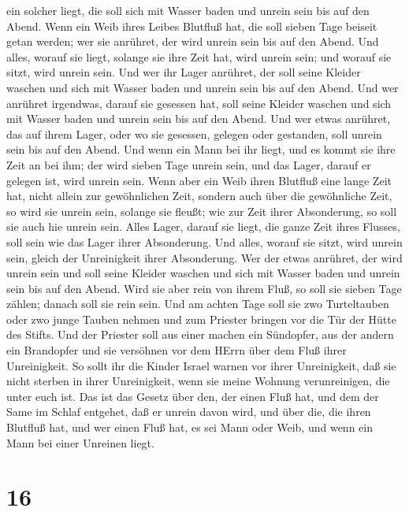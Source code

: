 ein solcher liegt, die soll sich mit Wasser baden und unrein sein bis
auf den Abend.  Wenn ein Weib ihres Leibes Blutfluß hat,
die soll sieben Tage beiseit getan werden; wer sie anrühret, der wird
unrein sein bis auf den Abend.  Und alles, worauf sie
liegt, solange sie ihre Zeit hat, wird unrein sein; und worauf sie
sitzt, wird unrein sein.  Und wer ihr Lager anrühret, der
soll seine Kleider waschen und sich mit Wasser baden und unrein sein bis
auf den Abend.  Und wer anrühret irgendwas, darauf sie
gesessen hat, soll seine Kleider waschen und sich mit Wasser baden und
unrein sein bis auf den Abend.  Und wer etwas anrühret, das
auf ihrem Lager, oder wo sie gesessen, gelegen oder gestanden, soll
unrein sein bis auf den Abend.  Und wenn ein Mann bei ihr
liegt, und es kommt sie ihre Zeit an bei ihm; der wird sieben Tage
unrein sein, und das Lager, darauf er gelegen ist, wird unrein sein.
 Wenn aber ein Weib ihren Blutfluß eine lange Zeit hat,
nicht allein zur gewöhnlichen Zeit, sondern auch über die gewöhnliche
Zeit, so wird sie unrein sein, solange sie fleußt; wie zur Zeit ihrer
Absonderung, so soll sie auch hie unrein sein.  Alles
Lager, darauf sie liegt, die ganze Zeit ihres Flusses, soll sein wie das
Lager ihrer Absonderung. Und alles, worauf sie sitzt, wird unrein sein,
gleich der Unreinigkeit ihrer Absonderung.  Wer der etwas
anrühret, der wird unrein sein und soll seine Kleider waschen und sich
mit Wasser baden und unrein sein bis auf den Abend.  Wird
sie aber rein von ihrem Fluß, so soll sie sieben Tage zählen; danach
soll sie rein sein.  Und am achten Tage soll sie zwo
Turteltauben oder zwo junge Tauben nehmen und zum Priester bringen vor
die Tür der Hütte des Stifts.  Und der Priester soll aus
einer machen ein Sündopfer, aus der andern ein Brandopfer und sie
versöhnen vor dem HErrn über dem Fluß ihrer Unreinigkeit. 
So sollt ihr die Kinder Israel warnen vor ihrer Unreinigkeit, daß sie
nicht sterben in ihrer Unreinigkeit, wenn sie meine Wohnung
verunreinigen, die unter euch ist.  Das ist das Gesetz über
den, der einen Fluß hat, und dem der Same im Schlaf entgehet, daß er
unrein davon wird,  und über die, die ihren Blutfluß hat,
und wer einen Fluß hat, es sei Mann oder Weib, und wenn ein Mann bei
einer Unreinen liegt.

\hypertarget{section-15}{%
\section{16}\label{section-15}}


